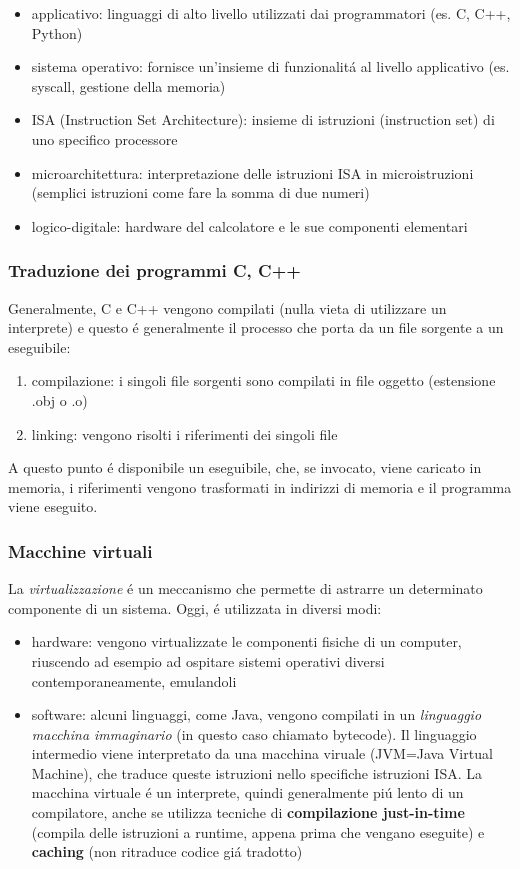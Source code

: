 \documentclass{article}
\begin{document}
\begin{itemize}
	\item applicativo: linguaggi di alto livello utilizzati dai programmatori (es. C, C++, Python)
	\item sistema operativo: fornisce un'insieme di funzionalitá al livello applicativo (es. syscall, gestione della memoria)
	\item ISA (Instruction Set Architecture): insieme di istruzioni (instruction set) di uno specifico processore
	\item microarchitettura: interpretazione delle istruzioni ISA in microistruzioni (semplici istruzioni come fare la somma di due numeri)
	\item logico-digitale: hardware del calcolatore e le sue componenti elementari
\end{itemize}

\subsubsection{Traduzione dei programmi C, C++}
Generalmente, C e C++ vengono compilati (nulla vieta di utilizzare un interprete) e questo é generalmente il processo che porta da un file sorgente a un eseguibile:
\begin{enumerate}
	\item compilazione: i singoli file sorgenti sono compilati in file oggetto (estensione .obj o .o)
	\item linking: vengono risolti i riferimenti dei singoli file
\end{enumerate}
A questo punto é disponibile un eseguibile, che, se invocato, viene caricato in memoria, i riferimenti vengono trasformati in indirizzi di memoria e il programma viene eseguito.

\subsubsection{Macchine virtuali}
La \textit{virtualizzazione} é un meccanismo che permette di astrarre un determinato componente di un sistema. Oggi, é utilizzata in diversi modi:
\begin{itemize}
	\item hardware: vengono virtualizzate le componenti fisiche di un computer, riuscendo ad esempio ad ospitare sistemi operativi diversi contemporaneamente, emulandoli
	\item software: alcuni linguaggi, come Java, vengono compilati in un \textit{linguaggio macchina immaginario} (in questo caso chiamato bytecode). Il linguaggio intermedio viene interpretato da una macchina viruale (JVM=Java Virtual Machine), che traduce queste istruzioni nello specifiche istruzioni ISA. La macchina virtuale é un interprete, quindi generalmente piú lento di un compilatore, anche se utilizza tecniche di \textbf{compilazione just-in-time} (compila delle istruzioni a runtime, appena prima che vengano eseguite) e \textbf{caching} (non ritraduce codice giá tradotto)
\end{itemize}
\end{document}
